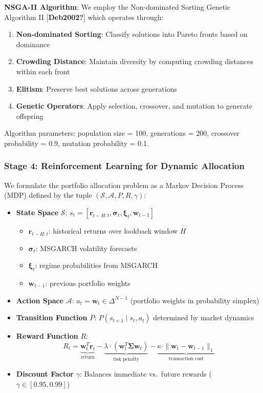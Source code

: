 \documentclass[
  10pt,
  a4paper,
]{article}
\providecommand{\tightlist}{%
  \setlength{\itemsep}{0pt}\setlength{\parskip}{0pt}}
\begin{document}
\textbf{NSGA-II Algorithm}: We employ the Non-dominated Sorting Genetic
Algorithm II {[}\textbf{Deb2002?}{]} which operates through:

\begin{enumerate}
\def\labelenumi{\arabic{enumi}.}
\tightlist
\item
  \textbf{Non-dominated Sorting}: Classify solutions into Pareto fronts
  based on dominance
\item
  \textbf{Crowding Distance}: Maintain diversity by computing crowding
  distances within each front
\item
  \textbf{Elitism}: Preserve best solutions across generations
\item
  \textbf{Genetic Operators}: Apply selection, crossover, and mutation
  to generate offspring
\end{enumerate}

Algorithm parameters: population size = 100, generations = 200,
crossover probability = 0.9, mutation probability = 0.1.

\subsubsection{Stage 4: Reinforcement Learning for Dynamic
Allocation}\label{sec-rl}

We formulate the portfolio allocation problem as a Markov Decision
Process (MDP) defined by the tuple
\((\mathcal{S}, \mathcal{A}, P, R, \gamma)\):

\begin{itemize}
\item
  \textbf{State Space} \(\mathcal{S}\):
  \(s_t = [\mathbf{r}_{t-H:t}, \boldsymbol{\sigma}_{t}, \boldsymbol{\xi}_t, \mathbf{w}_{t-1}]\)

  \begin{itemize}
  \tightlist
  \item
    \(\mathbf{r}_{t-H:t}\): historical returns over lookback window
    \(H\)
  \item
    \(\boldsymbol{\sigma}_t\): MSGARCH volatility forecasts
  \item
    \(\boldsymbol{\xi}_t\): regime probabilities from MSGARCH
  \item
    \(\mathbf{w}_{t-1}\): previous portfolio weights
  \end{itemize}
\item
  \textbf{Action Space} \(\mathcal{A}\):
  \(a_t = \mathbf{w}_t \in \Delta^{N-1}\) (portfolio weights in
  probability simplex)
\item
  \textbf{Transition Function} \(P\): \(P(s_{t+1} \mid s_t, a_t)\)
  determined by market dynamics
\item
  \textbf{Reward Function} \(R\):
  \[R_t = \underbrace{\mathbf{w}_t^T \mathbf{r}_t}_{\text{return}} - \underbrace{\lambda \cdot (\mathbf{w}_t^T \boldsymbol{\Sigma} \mathbf{w}_t)}_{\text{risk penalty}} - \underbrace{\kappa \cdot \|\mathbf{w}_t - \mathbf{w}_{t-1}\|_1}_{\text{transaction cost}}\]
\item
  \textbf{Discount Factor} \(\gamma\): Balances immediate vs.~future
  rewards (\(\gamma \in [0.95, 0.99]\))
\end{itemize}
\end{document}
